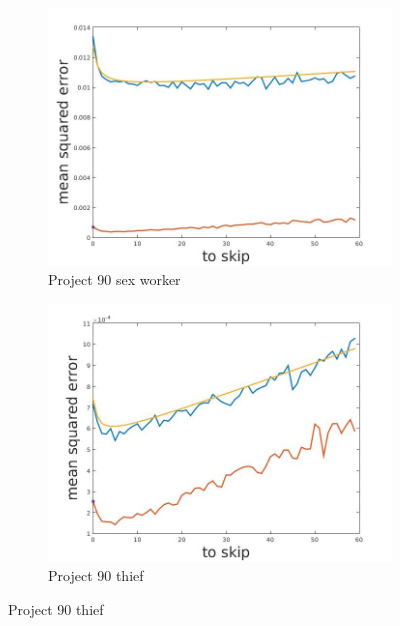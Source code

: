 \documentclass[12pt]{report}
\begin{document}
\begin{figure}[h]
\begin{subfigure}[b]{0.3\textwidth}
    \end{subfigure}
    ~
    \begin{subfigure}[b]{0.3\textwidth}
        \includegraphics[width=\textwidth]{estimators_sexWorker}
        \caption{ Project 90 sex worker }

    \end{subfigure}
    
    \begin{subfigure}[b]{0.3\textwidth}
        \includegraphics[width=\textwidth]{estimators_thief}
        \caption{ Project 90 thief}


\end{subfigure}
\end{figure}
\end{document}
